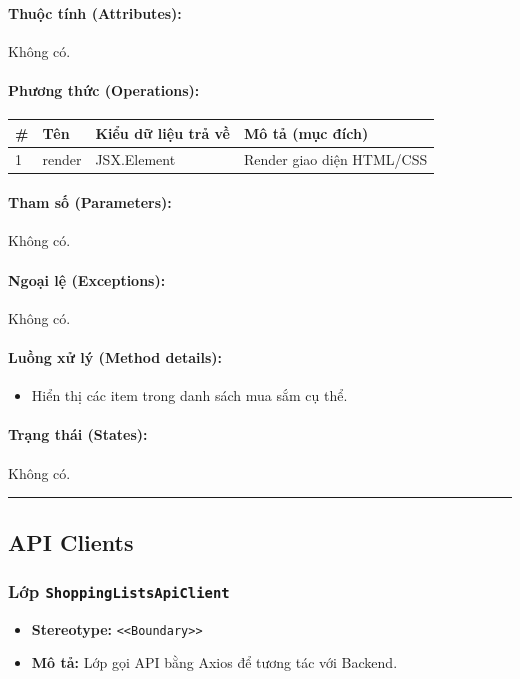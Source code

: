 \documentclass[12pt,a4paper]{article}
\begin{document}
\paragraph{Thuộc tính (Attributes):}
Không có.

\paragraph{Phương thức (Operations):}
\begin{longtable}{|p{0.6cm}|p{3.8cm}|p{2.6cm}|p{6.5cm}|}
\hline
\textbf{\#} & \textbf{Tên} & \textbf{Kiểu dữ liệu trả về} & \textbf{Mô tả (mục đích)} \\ \hline
\endhead
1 & render & JSX.Element & Render giao diện HTML/CSS \\ \hline
\end{longtable}

\paragraph{Tham số (Parameters):}
Không có.

\paragraph{Ngoại lệ (Exceptions):}
Không có.

\paragraph{Luồng xử lý (Method details):}
\begin{itemize}[leftmargin=*]
    \item Hiển thị các item trong danh sách mua sắm cụ thể.
\end{itemize}


\paragraph{Trạng thái (States):}
Không có.

\vskip 0.5cm
\noindent\rule{\textwidth}{0.5pt}
\vskip 0.5cm

\subsection{API Clients}

\subsubsection{Lớp \texttt{ShoppingListsApiClient}}
\begin{itemize}[leftmargin=*]
    \item \textbf{Stereotype:} \texttt{\textless{}\textless{}Boundary\textgreater{}\textgreater{}}
    \item \textbf{Mô tả:} Lớp gọi API bằng Axios để tương tác với Backend.
\end{itemize}
\end{document}
